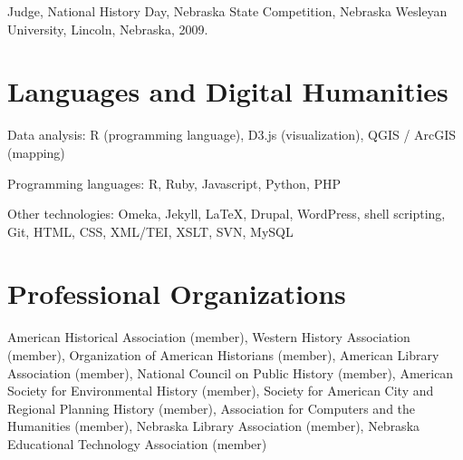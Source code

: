 Judge, National History Day, Nebraska State Competition, Nebraska
Wesleyan University, Lincoln, Nebraska, 2009.

\section{Languages and Digital
Humanities}\label{languages-and-digital-humanities}

Data analysis: R (programming language), D3.js (visualization), QGIS /
ArcGIS (mapping)

Programming languages: R, Ruby, Javascript, Python, PHP

Other technologies: Omeka, Jekyll, \LaTeX, Drupal, WordPress, shell
scripting, Git, HTML, CSS, XML/TEI, XSLT, SVN, MySQL

\section{Professional Organizations}\label{professional-organizations}

American Historical Association (member), Western History Association
(member), Organization of American Historians (member), American Library
Association (member), National Council on Public History (member),
American Society for Environmental History (member), Society for
American City and Regional Planning History (member), Association for
Computers and the Humanities (member), Nebraska Library Association
(member), Nebraska Educational Technology Association (member)
